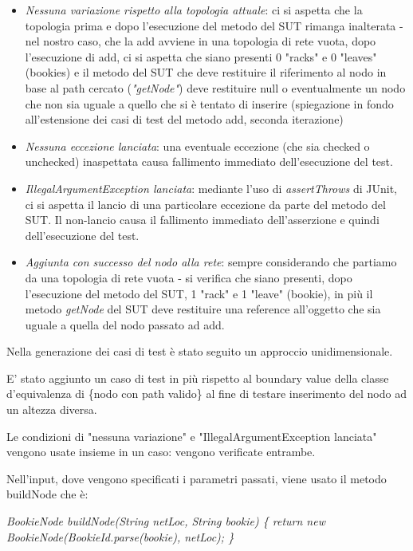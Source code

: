 \documentclass[10pt, a4paper]{article}
\begin{document}
	\begin{itemize}
		\item \textit{Nessuna variazione rispetto alla topologia attuale}: ci si aspetta che la 
		topologia prima e dopo l'esecuzione del metodo del SUT rimanga inalterata - nel nostro caso, 
		che la add avviene in una topologia di rete vuota, dopo l'esecuzione di add, ci si aspetta che 
		siano presenti 0 "racks" e 0 "leaves" (bookies) e il metodo del SUT che deve restituire il 
		riferimento al nodo in base al path cercato (\textit{"getNode"}) deve restituire null o eventualmente
		un nodo che non sia uguale a quello che si è tentato di inserire (spiegazione in fondo all'estensione
		dei casi di test del metodo add, seconda iterazione)
		\item \textit{Nessuna eccezione lanciata}: una eventuale eccezione (che sia checked o unchecked)
		inaspettata causa fallimento immediato dell'esecuzione del test.
		\item \textit{IllegalArgumentException lanciata}: mediante l'uso di \textit{assertThrows} di
		JUnit, ci si aspetta il lancio di una particolare eccezione da parte del metodo del SUT. Il
		non-lancio causa il fallimento immediato dell'asserzione e quindi dell'esecuzione del test.
		\item \textit{Aggiunta con successo del nodo alla rete}: sempre considerando che partiamo
		da una topologia di rete vuota - si verifica che siano presenti, dopo l'esecuzione del metodo
		del SUT, 1 "rack" e 1 "leave" (bookie), in più il metodo \textit{getNode} del SUT deve 
		restituire una reference all'oggetto che sia uguale a quella del nodo passato ad add.
	\end{itemize}
	
	Nella generazione dei casi di test è stato seguito un approccio unidimensionale.
	
	E' stato aggiunto un caso di test in più rispetto al boundary value della classe d'equivalenza di
	\{nodo con path valido\} al fine di testare inserimento del nodo ad un altezza diversa.
	
	Le condizioni di "nessuna variazione" e "IllegalArgumentException lanciata" vengono usate insieme
	in un caso: vengono verificate entrambe.	
	
	Nell'input, dove vengono specificati i parametri passati, viene usato il metodo buildNode che è:
	
	\textit{ BookieNode buildNode(String netLoc, String bookie) \{ return new
	BookieNode(BookieId.parse(bookie), netLoc); \} }
	
\end{document}
